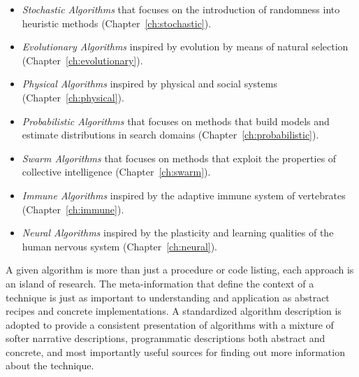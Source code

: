 \begin{bibunit}
\begin{itemize}
	\item \emph{Stochastic Algorithms} that focuses on the introduction of randomness into heuristic methods (Chapter~\ref{ch:stochastic}).
	\item \emph{Evolutionary Algorithms} inspired by evolution by means of natural selection (Chapter~\ref{ch:evolutionary}).
	\item \emph{Physical Algorithms} inspired by physical and social systems  (Chapter~\ref{ch:physical}).
	\item \emph{Probabilistic Algorithms} that focuses on methods that build models and estimate distributions in search domains (Chapter~\ref{ch:probabilistic}).
	\item \emph{Swarm Algorithms} that focuses on methods that exploit the properties of collective intelligence (Chapter~\ref{ch:swarm}).
	\item \emph{Immune Algorithms} inspired by the adaptive immune system of vertebrates (Chapter~\ref{ch:immune}). 
	\item \emph{Neural Algorithms} inspired by the plasticity and learning qualities of the human nervous system (Chapter~\ref{ch:neural}). 
\end{itemize}

A given algorithm is more than just a procedure or code listing, each approach is an island of research. The meta-information that define the context of a technique is just as important to understanding and application as abstract recipes and concrete implementations. A standardized algorithm description is adopted to provide a consistent presentation of algorithms with a mixture of softer narrative descriptions, programmatic descriptions both abstract and concrete, and most importantly useful sources for finding out more information about the technique.


\end{bibunit}
